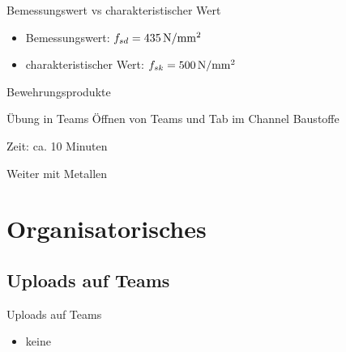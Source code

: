 \begin{frame}{Bemessungswert vs charakteristischer Wert}
	\begin{itemize}
		\item Bemessungswert: $f_{sd} = \myNmm{435}$
		\item charakteristischer Wert: $f_{sk} = \myNmm{500}$
	\end{itemize}

\end{frame}

\begin{frame}{Bewehrungsprodukte}
	\begin{block}{Übung in Teams}
		Öffnen von Teams und Tab im Channel Baustoffe

		Zeit: ca. 10 Minuten
		
	\end{block}

\end{frame}

\begin{frame}{Weiter mit Metallen}

\end{frame}





%


\section{Organisatorisches}
\BlueSectionSlide

\subsection{Uploads auf Teams}
\begin{frame}{Uploads auf Teams}
	\begin{itemize}
		\item[\textbullet] keine
	\end{itemize}

\end{frame}



\folieFragen
